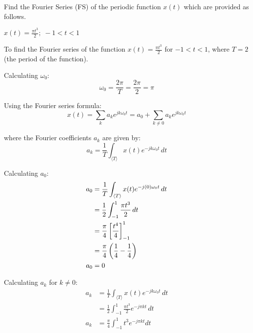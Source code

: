\documentclass[a4paper, 10pt]{article}
\begin{document}
\begin{problem}
Find the Fourier Series (FS) of the periodic function \( x(t) \) which are provided as follows.
\end{problem}


\begin{subproblems}[start=1]
    \item \( x(t) = \frac{\pi t^3}{2};\; -1 < t < 1 \)
\end{subproblems}

\begin{solution}
To find the Fourier series of the function \( x(t) = \frac{\pi t^3}{2} \) for \( -1 < t < 1 \), where \( T = 2 \) (the period of the function).

Calculating \( \omega_0 \):
\[ \omega_0 = \frac{2 \pi}{T} = \frac{2 \pi}{2} = \pi \]

Using the Fourier series formula:
\[ x(t) = \sum_{k} a_k e^{j k \omega_0 t} = a_0 + \sum_{k \neq 0} a_k e^{j k \omega_0 t} \]

where the Fourier coefficients \( a_k \) are given by:
\[ a_k = \frac{1}{T} \int_{\langle T \rangle} x(t) e^{-j k \omega_0 t} \,dt \]

Calculating \( a_0 \):
\begin{align*}
    a_0 &= \frac{1}{T} \int_{\langle T \rangle} x(t) e^{-j (0) \omega_0 t} \,dt \\
    &= \frac{1}{2} \int_{-1}^{1} \frac{\pi t^3}{2} \,dt \\
    &= \frac{\pi}{4} \left[ \frac{t^4}{4} \right]_{-1}^{1} \\
    &= \frac{\pi}{4} \left( \frac{1}{4} - \frac{1}{4} \right) \\
    a_0 &= 0
\end{align*}

\newpage

Calculating \( a_k \) for \( k \neq 0 \):
\begin{align*}
    a_k &= \frac{1}{T} \int_{\langle T \rangle} x(t) e^{-j k \omega_0 t} \,dt \\
    &= \frac{1}{2} \int_{-1}^{1} \frac{\pi t^3}{2} e^{-j \pi k t} \,dt \\
    a_k &= \frac{\pi}{4} \int_{-1}^{1} t^3 e^{-j \pi k t} dt
\end{align*}


\end{solution}
\end{document}
